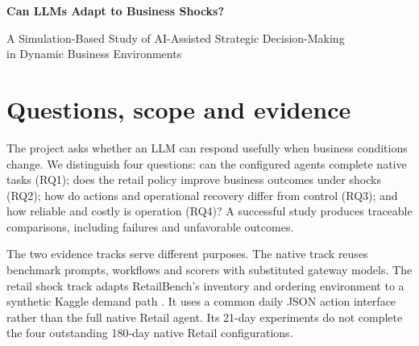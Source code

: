 \documentclass[11pt,a4paper]{article}
\begin{document}
\par
\vspace{0.6em}
{\LARGE\bfseries Can LLMs Adapt to Business Shocks?\par}
{\large A Simulation-Based Study of AI-Assisted Strategic Decision-Making\\in Dynamic Business Environments\par}
\vspace{0.5em}
\begin{abstract}
We evaluate a configured language-model retail policy under demand and delivery shocks, alongside a separate native benchmark track. The retail study contains \PrimaryEpisodes{} complete matched episodes, \PolicyDays{} policy-days and three selected store--product blocks. Raw LLM-with-fallback contribution exceeds the adaptive rule in \RawWins{}/9 shock comparisons; its control-adjusted contribution contrast is positive in \AdjustedWins{}/9. The mean adjusted effect is negative for demand surge and positive for demand decline and delivery disruption. Only \FirstPass{}/\Decisions{} decisions are valid on the first response; \RepairSuccess{} are repaired successfully and \Fallback{} use adaptive fallback. All fallback outcomes remain included. A baseline-only elasticity check adds 48 free episodes. The native track has 14 validated tasks, a retained ICBE failure and four deferred Retail configurations. These are descriptive results for three purposively selected blocks and one LLM realization per condition. Synthetic mechanisms, uncertain prior manual use of the evaluation window, pre-shock action differences and finite follow-up limit claims about adaptation and generalization.
\end{abstract}

\section{Questions, scope and evidence}
The project asks whether an LLM can respond usefully when business conditions change. We distinguish four questions: can the configured agents complete native tasks (RQ1); does the retail policy improve business outcomes under shocks (RQ2); how do actions and operational recovery differ from control (RQ3); and how reliable and costly is operation (RQ4)? A successful study produces traceable comparisons, including failures and unfavorable outcomes.

The two evidence tracks serve different purposes. The native track reuses benchmark prompts, workflows and scorers with substituted gateway models. The retail shock track adapts RetailBench's inventory and ordering environment to a synthetic Kaggle demand path \citep{retailbench2026,retailbench_code,atomicd_v8}. It uses a common daily JSON action interface rather than the full native Retail agent. Its 21-day experiments do not complete the four outstanding 180-day native Retail configurations.
\end{document}
